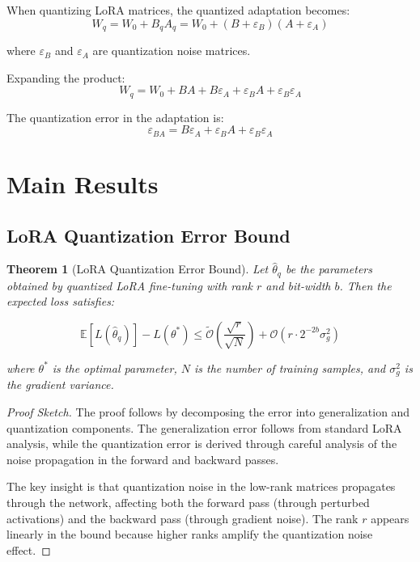 \documentclass[10pt,twocolumn]{article}
\newtheorem{theorem}{Theorem}[section]
\begin{document}
When quantizing LoRA matrices, the quantized adaptation becomes:
\begin{equation}
W_q = W_0 + B_q A_q = W_0 + (B + \varepsilon_B)(A + \varepsilon_A)
\end{equation}

where $\varepsilon_B$ and $\varepsilon_A$ are quantization noise matrices.

Expanding the product:
\begin{equation}
W_q = W_0 + BA + B\varepsilon_A + \varepsilon_B A + \varepsilon_B \varepsilon_A
\end{equation}

The quantization error in the adaptation is:
\begin{equation}
\varepsilon_{BA} = B\varepsilon_A + \varepsilon_B A + \varepsilon_B \varepsilon_A
\end{equation}

\section{Main Results}

\subsection{LoRA Quantization Error Bound}

\begin{theorem}[LoRA Quantization Error Bound]
\label{thm:main_bound}
Let $\hat{\theta}_q$ be the parameters obtained by quantized LoRA fine-tuning with rank $r$ and bit-width $b$. Then the expected loss satisfies:

\begin{equation}
\mathbb{E}[L(\hat{\theta}_q)] - L(\theta^*) \leq \tilde{\mathcal{O}}\left(\frac{\sqrt{r}}{\sqrt{N}}\right) + \mathcal{O}\left(r \cdot 2^{-2b} \sigma_g^2\right)
\end{equation}

where $\theta^*$ is the optimal parameter, $N$ is the number of training samples, and $\sigma_g^2$ is the gradient variance.
\end{theorem}

\begin{proof}[Proof Sketch]
The proof follows by decomposing the error into generalization and quantization components. The generalization error follows from standard LoRA analysis, while the quantization error is derived through careful analysis of the noise propagation in the forward and backward passes.

The key insight is that quantization noise in the low-rank matrices propagates through the network, affecting both the forward pass (through perturbed activations) and the backward pass (through gradient noise). The rank $r$ appears linearly in the bound because higher ranks amplify the quantization noise effect.
\end{proof}
\end{document}
